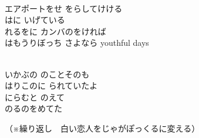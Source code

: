 \documentclass[10pt,b5j]{tarticle} %
\begin{document}
\vspace{1.5em} %
\newcommand{\linespace}{0.5em} %
\newcommand{\blocksize}{0.5\hsize} %
\newcommand{\itemmargin}{3em} %
\begin{enumerate} %
    \setlength{\itemindent}{\itemmargin}

    \item[（※）]~\\
    エアポートをせ
    をらしてけける\\
    はに
    いげている\\
    れるをに
    カンバのをければ\\
    はもうりぼっち
    さよなら youthful days

    \vspace{\linespace}
    \begin{minipage}[c]{\blocksize}
        
        \vspace{\linespace}
        \item~\\
        いかぶの
        のことそのも\\
        はりこのに
        られていたよ\\
        にらむと
        のえて\\
        のるのをめてた
        
        \vspace{\linespace}
        {\footnotesize（※繰り返し　白い恋人をじゃがぽっくるに変える）}
        
    \end{minipage}
    \begin{minipage}[c]{\blocksize}


\end{minipage}
\end{enumerate}
\end{document}
